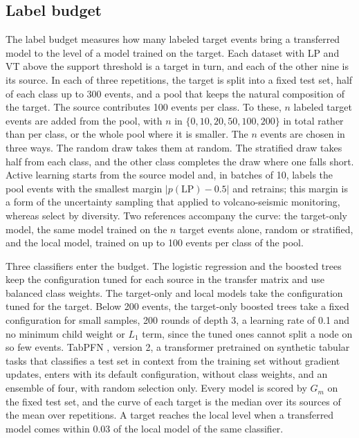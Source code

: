 \documentclass[pdflatex,sn-mathphys-num]{sn-jnl}
\begin{document}
\subsection{Label budget}\label{subsec:budget}

The label budget measures how many labeled target events bring a transferred
model to the level of a model trained on the target. Each dataset with LP and
VT above the support threshold is a target in turn, and each of the other
nine is its source. In each of three repetitions, the target is split into a
fixed test set, half of each class up to 300 events, and a pool that keeps
the natural composition of the target. The source contributes 100 events per class. To these, $n$ labeled target
events are added from the pool, with $n$ in $\{0, 10, 20, 50, 100, 200\}$
in total rather than per class, or the whole pool where it is smaller. The
$n$ events are chosen in three ways. The random draw takes them at random.
The stratified draw takes half from each class, and the other class
completes the draw where one falls short. Active learning starts from the
source model and, in batches of 10, labels the pool events with the
smallest margin $|p(\mathrm{LP}) - 0.5|$ and retrains; this margin is a form
of the uncertainty sampling that \cite{bueno_continuous_2022} applied to
volcano-seismic monitoring, whereas \cite{manley_deep_2022} select by
diversity. Two references accompany the curve: the target-only model, the
same model trained on the $n$ target events alone, random or stratified,
and the local model, trained on up to 100 events per class of the pool.

Three classifiers enter the budget. The logistic regression and the boosted
trees keep the configuration tuned for each source in the transfer matrix
and use balanced class weights. The target-only and local models take the
configuration tuned for the target. Below 200 events, the target-only
boosted trees take a fixed configuration for small samples, 200 rounds of
depth 3, a learning rate of 0.1 and no minimum child weight or $L_1$ term,
since the tuned ones cannot split a node on so few events. TabPFN
\cite{hollmann_accurate_2025}, version 2, a transformer pretrained on
synthetic tabular tasks that classifies a test set in context from the
training set without gradient updates, enters with its default
configuration, without class weights, and an ensemble of four, with random
selection only. Every model is scored by $G_m$ on the fixed test set, and the curve of each
target is the median over its sources of the mean over repetitions. A
target reaches the local level when a transferred model comes within 0.03 of
the local model of the same classifier.
\end{document}
